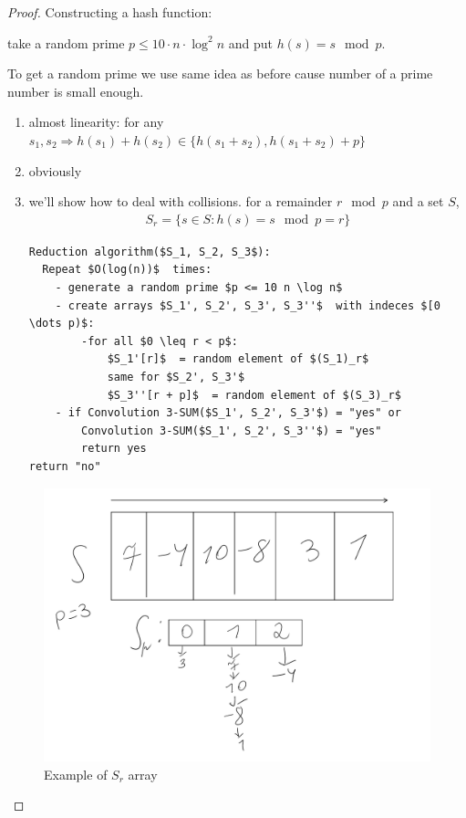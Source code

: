 \begin{proof}
  Constructing a hash function:

  take a random prime $p \leq 10 \cdot n \cdot \log^2 n$ and put $h(s) = s \mod p$.

  To get a random prime we use same idea as before cause number of a prime number is small enough.

  \begin{enumerate}
	\item almost linearity: for any $s_1, s_2 \Rightarrow h(s_1) + h(s_2) \in \{ h(s_1 + s_2), h(s_1 + s_2) + p \}$
	\item obviously
	\item we'll show how to deal with collisions.
	  for a remainder $r \mod p$ and a set $S$,
	  \begin{align*}
		S_r = \{s \in S: h(s) = s \mod p = r \}
	  \end{align*}


	  \begin{lstlisting}
Reduction algorithm($S_1, S_2, S_3$):
  Repeat $O(log(n))$  times:
	- generate a random prime $p <= 10 n \log n$
	- create arrays $S_1', S_2', S_3', S_3''$  with indeces $[0 \dots p)$:
		-for all $0 \leq r < p$:
			$S_1'[r]$  = random element of $(S_1)_r$
			same for $S_2', S_3'$
			$S_3''[r + p]$  = random element of $(S_3)_r$
	- if Convolution 3-SUM($S_1', S_2', S_3'$) = "yes" or
		Convolution 3-SUM($S_1', S_2', S_3''$) = "yes"
		return yes
return "no"
	  \end{lstlisting}

  \end{enumerate}

  \begin{figure}[ht]
	\center
	\includegraphics[scale=0.3]{figures/2.pdf}
	\caption{Example of $S_r$ array}
  \end{figure}


\end{proof}
